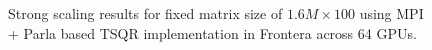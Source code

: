 \documentclass{article}
\makeatletter
\newcommand\resetstackedplotsOne{
\makeatletter
\pgfplots@stacked@isfirstplottrue
\makeatother
\addplot [forget plot,draw=none] coordinates{(1,0) (2,0) (4,0) (8,0) (16,0)};
}
\makeatother
\begin{document}
\begin{figure}
    \caption{ Strong scaling results for fixed matrix size of $1.6M \times 100$ using MPI + Parla based TSQR implementation in Frontera across 64 GPUs. \label{fig:parla_ss}}
\end{figure}




\end{document}
